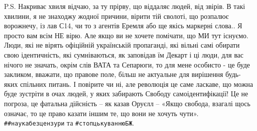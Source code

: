 P.S. Накриває хвиля відчаю, за ту прірву, що віддаляє людей, від звірів. В такі
хвилини, я не знаходжу жодної причини, вірити тій сволоті, що розпалює
ворожнечу, із лав С14, чи то з агентів Еремля або ще якісь маркерні слова.. Я
просто вам всім НЕ вірю. Але якщо ви не хочете помічати, що МИ тут існуємо.
Люди, які не вірять офіційній українській пропаганді, які вільні самі обирати
свою ідентичність, які сумніваються, як заповідав їм Декарт і ці люди, для вас
нічого не значать, окрім слів ВАТА та Сепарюги, то для мене особисто - це буде
закликом, вважати, що правове поле, більш не актуальне для вирішення будь-яких
спільних питань. І повірите чи ні, але революція це саме ласкаве, що можна буде
зустріти в очах людей, у яких забирають Свободу самоідентифікації! Це не
погроза, це фатальна дійсність – як казав Оруєлл – «Якщо свобода, взагалі щось
означає, то це право казати іншим те, що вони не хочуть чути».
\verb|##наукабезцензури| та \verb|#стопцькуваннюБЖ|.




